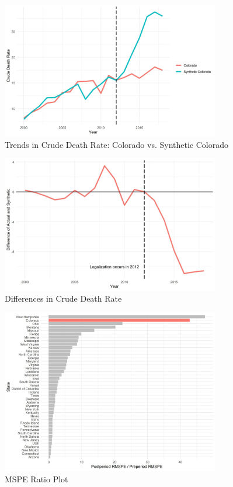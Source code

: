 \documentclass{article}
\begin{document}
\begin{figure}[H]
	\begin{center}
		\includegraphics[width=0.85\textwidth]{trends_plot_colorado}
	\end{center}
	\caption{Trends in Crude Death Rate: Colorado vs. Synthetic Colorado}
	\label{fig:trends_plot_colorado}
\end{figure}

\begin{figure}[H]
	\begin{center}
		\includegraphics[width=0.85\textwidth]{diffs_plot_colorado}
	\end{center}
	\caption{Differences in Crude Death Rate}
	\label{fig:diffs_plot_colorado}
\end{figure}


\begin{figure}[H]
	\begin{center}
		\includegraphics[width=0.85\textwidth]{mspe_plot_colorado}
	\end{center}
	\caption{MSPE Ratio Plot}
	\label{fig:mspe_plot_colorado}
\end{figure}
\end{document}
